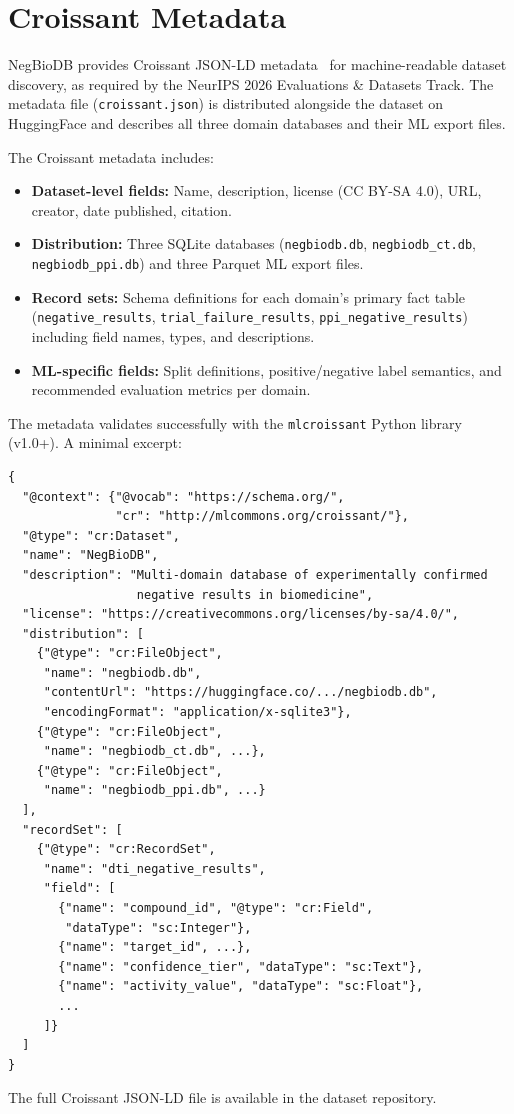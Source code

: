 \section{Croissant Metadata}
\label{app:croissant}

NegBioDB provides Croissant JSON-LD metadata~\citep{akhtar2024croissant} for machine-readable dataset discovery, as required by the NeurIPS 2026 Evaluations \& Datasets Track. The metadata file (\texttt{croissant.json}) is distributed alongside the dataset on HuggingFace and describes all three domain databases and their ML export files.

The Croissant metadata includes:
\begin{itemize}[nosep,leftmargin=*]
    \item \textbf{Dataset-level fields:} Name, description, license (CC BY-SA 4.0), URL, creator, date published, citation.
    \item \textbf{Distribution:} Three SQLite databases (\texttt{negbiodb.db}, \texttt{negbiodb\_ct.db}, \texttt{negbiodb\_ppi.db}) and three Parquet ML export files.
    \item \textbf{Record sets:} Schema definitions for each domain's primary fact table (\texttt{negative\_results}, \texttt{trial\_failure\_results}, \texttt{ppi\_negative\_results}) including field names, types, and descriptions.
    \item \textbf{ML-specific fields:} Split definitions, positive/negative label semantics, and recommended evaluation metrics per domain.
\end{itemize}

The metadata validates successfully with the \texttt{mlcroissant} Python library (v1.0+). A minimal excerpt:

\begin{small}
\begin{verbatim}
{
  "@context": {"@vocab": "https://schema.org/",
               "cr": "http://mlcommons.org/croissant/"},
  "@type": "cr:Dataset",
  "name": "NegBioDB",
  "description": "Multi-domain database of experimentally confirmed
                  negative results in biomedicine",
  "license": "https://creativecommons.org/licenses/by-sa/4.0/",
  "distribution": [
    {"@type": "cr:FileObject",
     "name": "negbiodb.db",
     "contentUrl": "https://huggingface.co/.../negbiodb.db",
     "encodingFormat": "application/x-sqlite3"},
    {"@type": "cr:FileObject",
     "name": "negbiodb_ct.db", ...},
    {"@type": "cr:FileObject",
     "name": "negbiodb_ppi.db", ...}
  ],
  "recordSet": [
    {"@type": "cr:RecordSet",
     "name": "dti_negative_results",
     "field": [
       {"name": "compound_id", "@type": "cr:Field",
        "dataType": "sc:Integer"},
       {"name": "target_id", ...},
       {"name": "confidence_tier", "dataType": "sc:Text"},
       {"name": "activity_value", "dataType": "sc:Float"},
       ...
     ]}
  ]
}
\end{verbatim}
\end{small}

The full Croissant JSON-LD file is available in the dataset repository.
